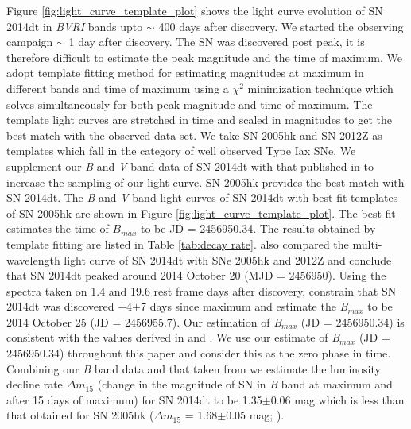 \documentclass[fleqn,usenatbib]{mnras}
\begin{document}
Figure \ref{fig:light_curve_template_plot} shows the light curve evolution of SN 2014dt in {\it BVRI} bands upto $\sim$ 400 days after discovery. We started the observing campaign $\sim$ 1 day after discovery. The SN was discovered post peak, it is therefore difficult to estimate the peak magnitude and the time of maximum. We adopt template fitting method for estimating magnitudes at maximum in different bands and time of maximum using a $\chi$$^2$ minimization technique which solves simultaneously for both peak magnitude and time of maximum. The template light curves are stretched in time and scaled in magnitudes to get the best match with the observed data set. We take SN 2005hk \citep{2008ApJ...680..580S,2014ApJ...786..134M} and SN 2012Z \citep{2015ApJ...806..191Y} as templates which fall in the category of well observed Type Iax SNe. We supplement our {\it B} and {\it V} band data of SN 2014dt with that published in \cite{2016ApJ...816L..13F} to increase the sampling of our light curve. SN 2005hk provides the best match with SN 2014dt. The {\it B} and {\it V} band light curves of SN 2014dt with best fit templates of SN 2005hk are shown in Figure \ref{fig:light_curve_template_plot}. The best fit estimates the time of $B$$_{max}$ to be JD = 2456950.34. The results obtained by template fitting are listed in Table \ref{tab:decay rate}.  \cite{2016ApJ...816L..13F} also compared the multi-wavelength light curve of SN 2014dt with SNe 2005hk and 2012Z and conclude that SN 2014dt peaked around 2014 October 20 (MJD = 2456950). Using the spectra taken on 1.4 and 19.6 rest frame days after discovery, \cite{2016MNRAS.461..433F} constrain that SN 2014dt was discovered +4$\pm$7 days since maximum and estimate the {\it B}$_{max}$ to be 2014 October 25 (JD = 2456955.7). Our estimation of {\it B}$_{max}$ (JD = 2456950.34) is consistent with the values derived in \cite{2016ApJ...816L..13F} and \cite{2016MNRAS.461..433F}. We use our estimate of {\it B}$_{max}$ (JD = 2456950.34) throughout this paper and consider this as the zero phase in time. Combining our {\it B} band data and that taken from \cite{2016ApJ...816L..13F} we estimate the luminosity decline rate $\Delta$$m{_{15}}$ (change in the magnitude of SN in {\it B} band at maximum and after 15 days of maximum) for SN 2014dt to be 1.35$\pm$0.06 mag which is less than that obtained for SN 2005hk ($\Delta$$m{_{15}}$ = 1.68$\pm$0.05 mag; \cite{2008ApJ...680..580S}). 
\end{document}
